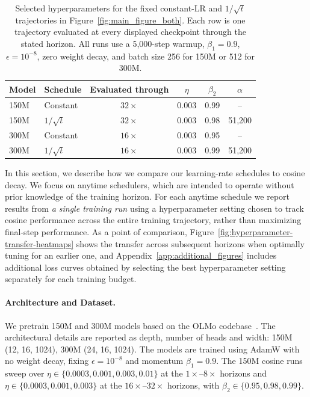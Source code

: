 \documentclass{article}
\theoremstyle{plain}
\begin{document}
\begin{table}[!t]
    \centering
    \small
    \setlength{\tabcolsep}{8pt}
    \begin{tabular}{llcccc}
        \toprule
        Model & Schedule & Evaluated through & $\eta$ & $\beta_2$ & $\alpha$ \\
        \midrule
        150M & Constant & $32\times$ & 0.003 & 0.99 & -- \\
        150M & $1/\sqrt{t}$ & $32\times$ & 0.003 & 0.98 & 51,200 \\
        \midrule
        300M & Constant & $16\times$ & 0.003 & 0.95 & -- \\
        300M & $1/\sqrt{t}$ & $16\times$ & 0.003 & 0.99 & 51,200 \\
        \bottomrule
    \end{tabular}
    \caption{Selected hyperparameters for the fixed constant-LR and $1/\sqrt{t}$ trajectories in Figure~\ref{fig:main_figure_both}. Each row is one trajectory evaluated at every displayed checkpoint through the stated horizon. All runs use a 5,000-step warmup, $\beta_1=0.9$, $\epsilon=10^{-8}$, zero weight decay, and batch size 256 for 150M or 512 for 300M.}
    \label{tab:figure2-selected-hps}
\end{table}
In this section, we describe how we compare our learning-rate schedules to cosine decay. We focus on anytime schedulers, which are intended to operate without prior knowledge of the training horizon. For each anytime schedule we report results from \textit{a single training run} using a hyperparameter setting chosen to track cosine performance across the entire training trajectory, rather than maximizing final-step performance. As a point of comparison, Figure~\ref{fig:hyperparameter-transfer-heatmaps} shows the transfer across subsequent horizons when optimally tuning for an earlier one, and Appendix~\ref{app:additional_figures} includes additional loss curves obtained by selecting the best hyperparameter setting separately for each training budget.
\paragraph{Architecture and Dataset.}
We pretrain 150M and 300M models based on the OLMo codebase~\citep{groeneveld2024olmo,olmo20242,olmo2025olmo}. The architectural details are reported as depth, number of heads and width: 150M (12, 16, 1024), 300M (24, 16, 1024). The models are trained using AdamW with no weight decay, fixing $\epsilon = 10^{-8}$ and momentum $\beta_1=0.9$. The 150M cosine runs sweep over $\eta\in\{0.0003,0.001,0.003,0.01\}$ at the $1\times$--$8\times$ horizons and $\eta\in\{0.0003,0.001,0.003\}$ at the $16\times$--$32\times$ horizons, with $\beta_2\in\{0.95,0.98,0.99\}$. 
\end{document}
